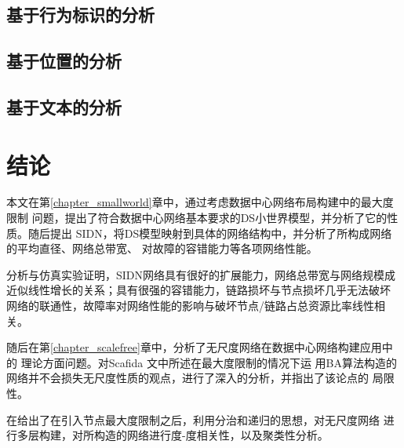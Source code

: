 \documentclass[master,winfonts]{jnuthesis}
\begin{document}
\section{基于行为标识的分析}
\Blindtext

\section{基于位置的分析}
\Blindtext

\section{基于文本的分析}
\Blindtext

\chapter{结论}\label{chapter_concludes}

本文在第\ref{chapter_smallworld}章中，通过考虑数据中心网络布局构建中的最大度限制
问题，提出了符合数据中心网络基本要求的DS小世界模型，并分析了它的性质。随后提出
SIDN，将DS模型映射到具体的网络结构中，并分析了所构成网络的平均直径、网络总带宽、
对故障的容错能力等各项网络性能。

分析与仿真实验证明，SIDN网络具有很好的扩展能力，网络总带宽与网络规模成
近似线性增长的关系；具有很强的容错能力，链路损坏与节点损坏几乎无法破坏
网络的联通性，故障率对网络性能的影响与破坏节点/链路占总资源比率线性相关。

随后在第\ref{chapter_scalefree}章中，分析了无尺度网络在数据中心网络构建应用中的
理论方面问题。对Scafida \cite{gyarmati2010scafida}文中所述在最大度限制的情况下运
用BA算法构造的网络并不会损失无尺度性质的观点，进行了深入的分析，并指出了该论点的
局限性。

在给出了在引入节点最大度限制之后，利用分治和递归的思想，对无尺度网络
进行多层构建，对所构造的网络进行度-度相关性，以及聚类性分析。
\end{document}

